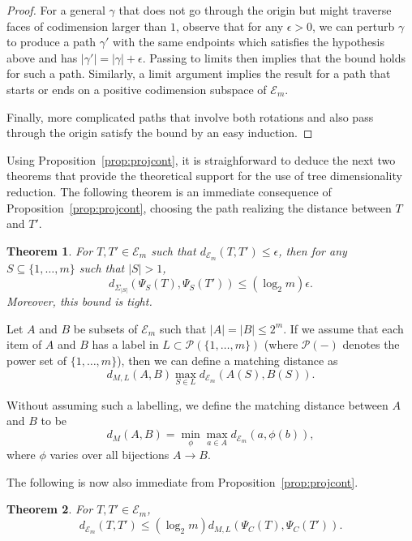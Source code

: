 \documentclass[a4paper,11pt]{article}
\newtheorem{theorem}{Theorem}[section]
\newcommand{\aE}{\mathcal{E}}
\newcommand{\aP}{\mathcal{P}}
\begin{document}
\begin{proof}
For a general $\gamma$ that does not go through the origin but might traverse faces of codimension larger than $1$, observe that for any $\epsilon > 0$, we can perturb $\gamma$ to produce a path $\gamma'$ with the same endpoints which satisfies the hypothesis above and has $|\gamma'| = |\gamma| + \epsilon$.
Passing to limits then implies that the bound holds for such a path.
Similarly, a limit argument implies the result for a path that starts or ends on a positive codimension subspace of $\aE_m$.

Finally, more complicated paths that involve both rotations and also pass through the origin satisfy the bound by an easy induction.
\end{proof}

Using Proposition~\ref{prop:projcont}, it is straighforward to deduce the next two theorems that provide the theoretical support for the use of tree dimensionality reduction.
The following theorem is an immediate consequence of Proposition~\ref{prop:projcont}, choosing the path realizing the distance between $T$ and $T'$.

\begin{theorem}\label{thm:stab}
For $T,T' \in \aE_m$ such that $d_{\aE_m}(T,T') \leq \epsilon$, then for any $S \subseteq \{1,\ldots,m\}$ such that $|S| > 1$, 
\[
d_{\Sigma_{|S|}}(\Psi_S(T), \Psi_S(T')) \leq (\log_2 m)\epsilon.
\]
Moreover, this bound is tight.
\end{theorem}

Let $A$ and $B$ be subsets of $\aE_m$ such that $|A| = |B| \leq 2^m$.
If we assume that each item of $A$ and $B$ has a label in $L \subset \aP(\{1,\ldots,m\})$ (where $\aP(-)$ denotes the power set of $\{1,\ldots,m\}$), then we can define a matching distance as
\[
d_{M,L}(A,B) \max_{S \in L} d_{\aE_m}(A(S), B(S)).
\]

Without assuming such a labelling, we define the matching distance between $A$ and $B$ to be 
\[
d_M(A,B) = \min_{\phi} \max_{a \in A} d_{\aE_m}(a,\phi(b)),
\]
where $\phi$ varies over all bijections $A \to B$.

The following is now also immediate from Proposition~\ref{prop:projcont}.

\begin{theorem}\label{thm:converse}
For $T, T' \in \aE_m$, 
\[
d_{\aE_m}(T,T') \leq (\log_2 m) d_{M,L}(\Psi_C(T), \Psi_C(T')).
\]
\end{theorem}
\end{document}
